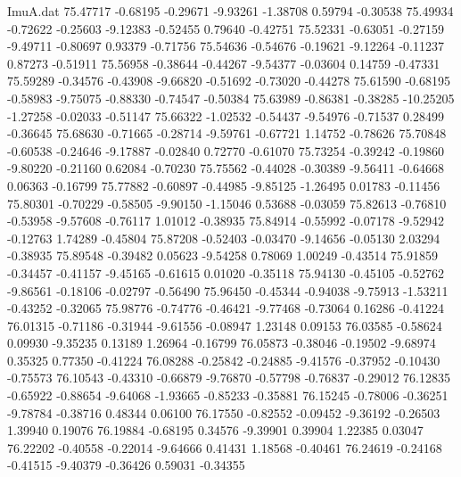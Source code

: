\begin{filecontents}{ImuA.dat}
  75.47717   -0.68195   -0.29671   -9.93261   -1.38708    0.59794   -0.30538
  75.49934   -0.72622   -0.25603   -9.12383   -0.52455    0.79640   -0.42751
  75.52331   -0.63051   -0.27159   -9.49711   -0.80697    0.93379   -0.71756
  75.54636   -0.54676   -0.19621   -9.12264   -0.11237    0.87273   -0.51911
  75.56958   -0.38644   -0.44267   -9.54377   -0.03604    0.14759   -0.47331
  75.59289   -0.34576   -0.43908   -9.66820   -0.51692   -0.73020   -0.44278
  75.61590   -0.68195   -0.58983   -9.75075   -0.88330   -0.74547   -0.50384
  75.63989   -0.86381   -0.38285  -10.25205   -1.27258   -0.02033   -0.51147
  75.66322   -1.02532   -0.54437   -9.54976   -0.71537    0.28499   -0.36645
  75.68630   -0.71665   -0.28714   -9.59761   -0.67721    1.14752   -0.78626
  75.70848   -0.60538   -0.24646   -9.17887   -0.02840    0.72770   -0.61070
  75.73254   -0.39242   -0.19860   -9.80220   -0.21160    0.62084   -0.70230
  75.75562   -0.44028   -0.30389   -9.56411   -0.64668    0.06363   -0.16799
  75.77882   -0.60897   -0.44985   -9.85125   -1.26495    0.01783   -0.11456
  75.80301   -0.70229   -0.58505   -9.90150   -1.15046    0.53688   -0.03059
  75.82613   -0.76810   -0.53958   -9.57608   -0.76117    1.01012   -0.38935
  75.84914   -0.55992   -0.07178   -9.52942   -0.12763    1.74289   -0.45804
  75.87208   -0.52403   -0.03470   -9.14656   -0.05130    2.03294   -0.38935
  75.89548   -0.39482    0.05623   -9.54258    0.78069    1.00249   -0.43514
  75.91859   -0.34457   -0.41157   -9.45165   -0.61615    0.01020   -0.35118
  75.94130   -0.45105   -0.52762   -9.86561   -0.18106   -0.02797   -0.56490
  75.96450   -0.45344   -0.94038   -9.75913   -1.53211   -0.43252   -0.32065
  75.98776   -0.74776   -0.46421   -9.77468   -0.73064    0.16286   -0.41224
  76.01315   -0.71186   -0.31944   -9.61556   -0.08947    1.23148    0.09153
  76.03585   -0.58624    0.09930   -9.35235    0.13189    1.26964   -0.16799
  76.05873   -0.38046   -0.19502   -9.68974    0.35325    0.77350   -0.41224
  76.08288   -0.25842   -0.24885   -9.41576   -0.37952   -0.10430   -0.75573
  76.10543   -0.43310   -0.66879   -9.76870   -0.57798   -0.76837   -0.29012
  76.12835   -0.65922   -0.88654   -9.64068   -1.93665   -0.85233   -0.35881
  76.15245   -0.78006   -0.36251   -9.78784   -0.38716    0.48344    0.06100
  76.17550   -0.82552   -0.09452   -9.36192   -0.26503    1.39940    0.19076
  76.19884   -0.68195    0.34576   -9.39901    0.39904    1.22385    0.03047
  76.22202   -0.40558   -0.22014   -9.64666    0.41431    1.18568   -0.40461
  76.24619   -0.24168   -0.41515   -9.40379   -0.36426    0.59031   -0.34355

\end{filecontents}
